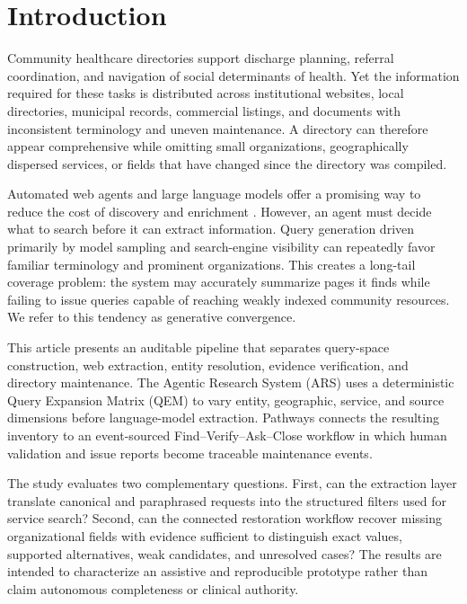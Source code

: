 \documentclass[journal,article,submit,moreauthors]{Definitions/mdpi}
\begin{document}
\section{Introduction}

Community healthcare directories support discharge planning, referral coordination, and navigation of social determinants of health. Yet the information required for these tasks is distributed across institutional websites, local directories, municipal records, commercial listings, and documents with inconsistent terminology and uneven maintenance. A directory can therefore appear comprehensive while omitting small organizations, geographically dispersed services, or fields that have changed since the directory was compiled.

Automated web agents and large language models offer a promising way to reduce the cost of discovery and enrichment \citep{nakano2021webgpt,zhou2024webarena,yao2023react}. However, an agent must decide what to search before it can extract information. Query generation driven primarily by model sampling and search-engine visibility can repeatedly favor familiar terminology and prominent organizations. This creates a long-tail coverage problem: the system may accurately summarize pages it finds while failing to issue queries capable of reaching weakly indexed community resources. We refer to this tendency as generative convergence.

This article presents an auditable pipeline that separates query-space construction, web extraction, entity resolution, evidence verification, and directory maintenance. The Agentic Research System (ARS) uses a deterministic Query Expansion Matrix (QEM) to vary entity, geographic, service, and source dimensions before language-model extraction. Pathways connects the resulting inventory to an event-sourced Find--Verify--Ask--Close workflow in which human validation and issue reports become traceable maintenance events.

The study evaluates two complementary questions. First, can the extraction layer translate canonical and paraphrased requests into the structured filters used for service search? Second, can the connected restoration workflow recover missing organizational fields with evidence sufficient to distinguish exact values, supported alternatives, weak candidates, and unresolved cases? The results are intended to characterize an assistive and reproducible prototype rather than claim autonomous completeness or clinical authority.
\end{document}
